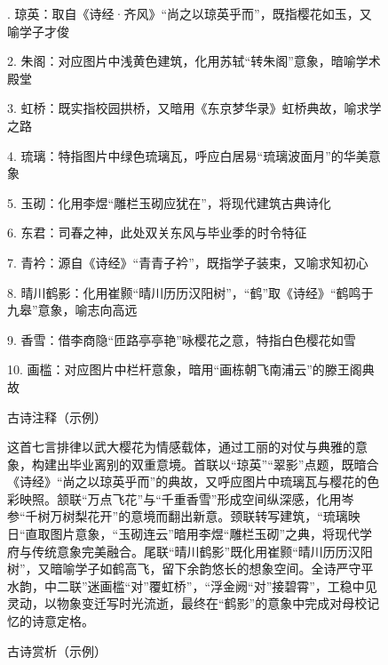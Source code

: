 \begin{figure}[ht]
  \begin{tcolorbox}[
      colback=white, %
      colframe=black, 
      boxrule=1pt,        %
      arc=0mm,             %
  ]. 琼英：取自《诗经·齐风》“尚之以琼英乎而”，既指樱花如玉，又喻学子才俊\par
      2. 朱阁：对应图片中浅黄色建筑，化用苏轼“转朱阁”意象，暗喻学术殿堂\par
      3. 虹桥：既实指校园拱桥，又暗用《东京梦华录》虹桥典故，喻求学之路\par
      4. 琉璃：特指图片中绿色琉璃瓦，呼应白居易“琉璃波面月”的华美意象\par
      5. 玉砌：化用李煜“雕栏玉砌应犹在”，将现代建筑古典诗化\par
      6. 东君：司春之神，此处双关东风与毕业季的时令特征\par
      7. 青衿：源自《诗经》“青青子衿”，既指学子装束，又喻求知初心\par
      8. 晴川鹤影：化用崔颢“晴川历历汉阳树”，“鹤”取《诗经》“鹤鸣于九皋”意象，喻志向高远\par
      9. 香雪：借李商隐“匝路亭亭艳”咏樱花之意，特指白色樱花如雪\par
      10. 画槛：对应图片中栏杆意象，暗用“画栋朝飞南浦云”的滕王阁典故\par
  \end{tcolorbox}
  \caption{古诗注释（示例）}
  \label{fig:example_annotation} %
\end{figure}

\begin{figure}[ht]
  \begin{tcolorbox}[
      colback=white, %
      colframe=black, 
      boxrule=1pt,        %
      arc=0mm,             %
  ]
      \kaishu 这首七言排律以武大樱花为情感载体，通过工丽的对仗与典雅的意象，构建出毕业离别的双重意境。首联以“琼英”“翠影”点题，既暗合《诗经》“尚之以琼英乎而”的典故，又呼应图片中琉璃瓦与樱花的色彩映照。颔联“万点飞花”与“千重香雪”形成空间纵深感，化用岑参“千树万树梨花开”的意境而翻出新意。颈联转写建筑，“琉璃映日“直取图片意象，“玉砌连云”暗用李煜“雕栏玉砌”之典，将现代学府与传统意象完美融合。尾联“晴川鹤影”既化用崔颢“晴川历历汉阳树”，又暗喻学子如鹤高飞，留下余韵悠长的想象空间。全诗严守平水韵，中二联”迷画槛“对”覆虹桥”，“浮金阙“对”接碧霄”，工稳中见灵动，以物象变迁写时光流逝，最终在“鹤影”的意象中完成对母校记忆的诗意定格。
  \end{tcolorbox}
  \caption{古诗赏析（示例）}
  \label{fig:example_appreciation} %
\end{figure}

